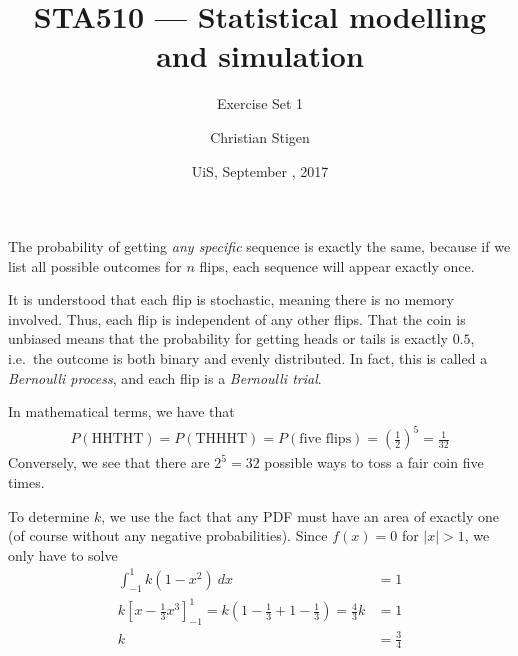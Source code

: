 \documentclass[a4paper,english,12pt]{article}
\title{STA510 --- Statistical modelling and simulation}
\subtitle{Exercise Set 1}
\author{Christian Stigen}
\date{UiS, September \nth{21}, 2017}
\begin{document}
\maketitle

The probability of getting \textit{any specific} sequence is exactly the same,
because if we list all possible outcomes for $n$ flips, each sequence will
appear exactly once.

It is understood that each flip is stochastic, meaning there is no memory
involved. Thus, each flip is independent of any other flips. That the coin is
unbiased means that the probability for getting heads or tails is exactly
$0.5$, i.e.~the outcome is both binary and evenly distributed. In fact, this is
called a \textit{Bernoulli process}, and each flip is a \textit{Bernoulli
trial}.

In mathematical terms, we have that
\begin{align*}
  P(\textrm{HHTHT}) = P(\textrm{THHHT}) = P(\textrm{five flips}) =
    \left(\frac{1}{2}\right)^5 = \frac{1}{32}
\end{align*}
Conversely, we see that there are $2^5 = 32$ possible ways to toss a fair coin
five times.





To determine $k$, we use the fact that any PDF must have an area of exactly one
(of course without any negative probabilities). Since $f(x) = 0$ for $|x|
> 1$, we only have to solve
\begin{align*}
  \int_{-1}^{1}{k(1-x^2)~dx} &= 1 \\
  k\left[ x - \frac{1}{3}{x^3} \right]_{-1}^{1} =
  k\left( 1 - \frac{1}{3} + 1 - \frac{1}{3} \right) = \frac{4}{3}k &= 1 \\
   k &= \frac{3}{4}
\end{align*}







\end{document}
